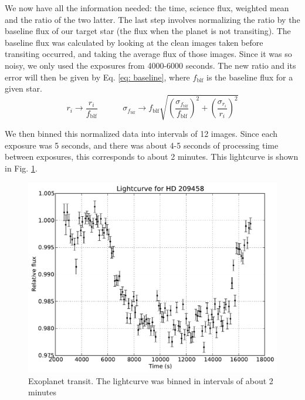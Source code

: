 \documentclass{aastex61}
\begin{document}
We now have all the information needed: the time, science flux, weighted mean and the ratio of the two latter. The last step involves normalizing the ratio by the baseline flux of our target star (the flux when the planet is not transiting). The baseline flux was calculated by looking at the clean images taken before transiting occurred, and taking the average flux of those images. Since it was so noisy, we only used the exposures from 4000-6000 seconds. The new ratio and its error will then be given by Eq. \eqref{eq: baseline}, where $f_{\text{blf}}$ is the baseline flux for a given star.
\begin{equation}\label{eq: baseline}
r_{i} \rightarrow \frac{r_{i}}{f_{\text{blf}}} \;\;\;\;\;\;\;\;\;\;\; \sigma_{ f_{\text{blf}}} \rightarrow f_{\text{blf}} \sqrt{\left( \frac{\sigma_{ f_{\text{blf}}}}{f_{\text{blf}}}\right) ^{2} + \left( \frac{\sigma_{ r_{i}}}{r_{i}}\right) ^{2}}
\end{equation}

We then binned this normalized data into intervals of 12 images. Since each exposure was 5 seconds, and there was about 4-5 seconds of processing time between exposures, this corresponds to about 2 minutes. This lightcurve is shown in Fig. \ref{fig: lightcurve}.

\begin{figure}[hbt!]
	\centering
	\includegraphics[scale = .75]{exo_lightcurve.pdf}
	\caption{Exoplanet transit. The lightcurve was binned in intervals of about 2 minutes}
	\label{fig: lightcurve}
\end{figure}
\end{document}
